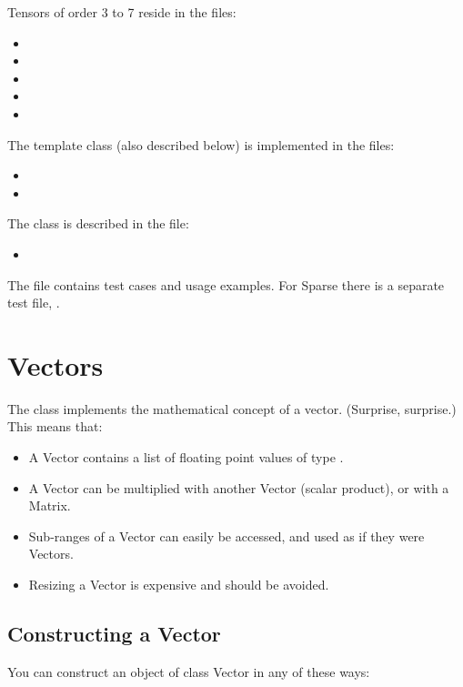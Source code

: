 Tensors of order 3 to 7 reside in the files:
\begin{itemize}
\item {}
\item {}
\item {}
\item {}
\item {}
\end{itemize}

The template class  (also described below) is implemented 
in the files:
\begin{itemize}
\item {}
\item {}
\end{itemize}

The  class is described in the file:
\begin{itemize}
\item {}
\end{itemize}

The file  contains test cases and usage
examples. For Sparse there is a separate test file, 
.

\section{Vectors}
\label{sec:matpack:vectors}

The class  implements the mathematical concept of a
vector. (Surprise, surprise.) This means that:
\begin{itemize}
\item A Vector contains a list of floating point values of type .
\item A Vector can be multiplied with another Vector (scalar product),
  or with a Matrix.
\item Sub-ranges of a Vector can easily be accessed, and used as if
  they were Vectors.
\item Resizing a Vector is expensive and should be avoided.
\end{itemize}

\subsection{Constructing a Vector}
You can construct an object of class Vector in any of these ways:

